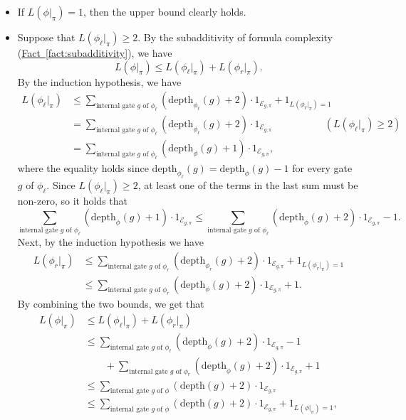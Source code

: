 \documentclass[11pt]{article}
\numberwithin{equation}{section}
\theoremstyle{definition}
\theoremstyle{plain}
\newcommand{\expref}[2]{\hyperref[#2]{#1~\ref{#2}}}
\theoremstyle{definition}\newtheorem{notation}[theorem]{Notation}\theoremstyle{plain}
\newcommand{\dpt}{\mathrm{depth}}
\newcommand{\cE}{\mathcal{E}}
\theoremstyle{definition}
\theoremstyle{plain}
\begin{document}
\begin{itemize}
\item If $L(\phi|_{\pi})=1$, then the upper bound clearly holds. 
\item Suppose that $L(\phi_{\ell}|_{\pi})\ge2$. By the subadditivity of
formula complexity (\expref{Fact}{fact:subadditivity}), we have 
\[
L(\phi|_{\pi})\le L(\phi_{\ell}|_{\pi})+L(\phi_{r}|_{\pi}).
\]
By the induction hypothesis, we have 
\begin{align*}
L(\phi_{\ell}|_{\pi}) & \le\sum_{\text{internal gate }g\text{ of }\phi_{\ell}}(\dpt_{\phi_{\ell}}(g)+2)\cdot1_{\cE_{g,\pi}}+1_{L(\phi_{\ell}|_{\pi})=1}\\
 & =\sum_{\text{internal gate }g\text{ of }\phi_{\ell}}(\dpt_{\phi_{\ell}}(g)+2)\cdot1_{\cE_{g,\pi}} & (L(\phi_{\ell}|_{\pi})\ge2)\\
 & =\sum_{\text{internal gate }g\text{ of }\phi_{\ell}}(\dpt_{\phi}(g)+1)\cdot1_{\cE_{g,\pi}},
\end{align*}
where the equality holds since $\dpt_{\phi_{\ell}}(g)=\dpt_{\phi}(g)-1$
for every gate~$g$ of $\phi_{\ell}$. Since $L(\phi_{\ell}|_{\pi})\ge2$,
at least one of the terms in the last sum must be non-zero, so it
holds that 
\[
\sum_{\text{internal gate }g\text{ of }\phi_{\ell}}(\dpt_{\phi}(g)+1)\cdot1_{\cE_{g,\pi}}\le\sum_{\text{internal gate }g\text{ of }\phi_{\ell}}(\dpt_{\phi}(g)+2)\cdot1_{\cE_{g,\pi}}-1.
\]
Next, by the induction hypothesis we have 
\begin{align*}
L(\phi_{r}|_{\pi}) & \le\sum_{\text{internal gate }g\text{ of }\phi_{r}}(\dpt_{\phi_{r}}(g)+2)\cdot1_{\cE_{g,\pi}}+1_{L(\phi_{r}|_{\pi})=1}\\
 & \le\sum_{\text{internal gate }g\text{ of }\phi_{r}}(\dpt_{\phi}(g)+2)\cdot1_{\cE_{g,\pi}}+1.
\end{align*}
By combining the two bounds, we get that 
\begin{align*}
L(\phi|_{\pi}) & \le L(\phi_{\ell}|_{\pi})+L(\phi_{r}|_{\pi})\\
 & \le\sum_{\text{internal gate }g\text{ of }\phi_{\ell}}(\dpt_{\phi}(g)+2)\cdot1_{\cE_{g,\pi}}-1\\
 & \qquad+\sum_{\text{internal gate }g\text{ of }\phi_{r}}(\dpt_{\phi}(g)+2)\cdot1_{\cE_{g,\pi}}+1\\
 & \le\sum_{\text{internal gate }g\text{ of }\phi}(\dpt(g)+2)\cdot1_{\cE_{g,\pi}}\\
 & \le\sum_{\text{internal gate }g\text{ of }\phi}(\dpt(g)+2)\cdot1_{\cE_{g,\pi}}+1_{L(\phi|_{\pi})=1},
\end{align*}

\end{itemize}
\end{document}

